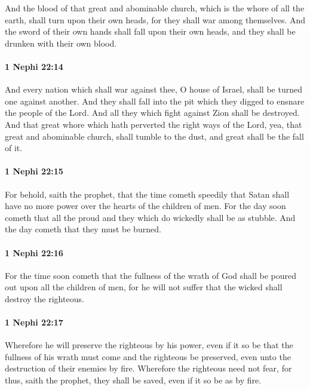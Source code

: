 			And the blood of that great and abominable church,
			which is the whore of all the earth,
			shall turn upon their own heads,
			for they shall war among themselves.
			And the sword of their own hands shall fall upon their own heads,
			and they shall be drunken with their own blood.

		\paragraph{1 Nephi 22:14} %
			\label{1 Nephi-22-14}

			And every nation which shall war against thee, O house of Israel,
			shall be turned one against another.
			And they shall fall into the pit
			which they digged to ensnare the people of the Lord.
			And all they which fight against Zion shall be destroyed.
			And that great whore which hath perverted the right ways of the Lord,
			yea, that great and abominable church,
			shall tumble to the dust,
			and great shall be the fall of it.

		\paragraph{1 Nephi 22:15} %
			\label{1 Nephi-22-15}

			For behold, saith the prophet, that the time cometh speedily
			that Satan shall have no more power over the hearts of the children of men.
			For the day soon cometh
			that all the proud and they which do wickedly shall be as stubble.
			And the day cometh that they must be burned.

		\paragraph{1 Nephi 22:16} %
			\label{1 Nephi-22-16}

			For the time soon cometh that
			the fullness of the wrath of God shall be poured out upon all the children of men,
			for he will not suffer that the wicked shall destroy the righteous.

		\paragraph{1 Nephi 22:17} %
			\label{1 Nephi-22-17}

			Wherefore he will preserve the righteous by his power,
			even if it so be that the fullness of his wrath must come
			and the righteous be preserved,
			even unto the destruction of their enemies by fire.
			Wherefore the righteous need not fear,
			for thus, saith the prophet, they shall be saved,
			even if it so be as by fire.

